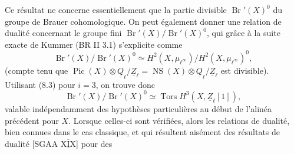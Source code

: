  Ce résultat ne concerne essentiellement que la partie divisible $\operatorname{Br}'(X)^0$ du groupe de Brauer cohomologique. On peut également donner une relation de dualité concernant le  groupe fini $\operatorname{Br}'(X)/\operatorname{Br}'(X)^0$, qui grâce à la suite exacte de Kummer (BR II 3.1) s'explicite comme
\[
\tag{8.8}\operatorname{Br}'(X)/\operatorname{Br}'(X)^0\simeq H^2(X,\mu_{\ell^\infty})/H^2(X,\mu_{\ell^\infty})^0,
\]
(compte tenu que $\operatorname{Pic}(X)\otimes\underline Q_{\ell}/\underline Z_{\ell}=\operatorname{NS}(X)\otimes\underline Q_{\ell}/\underline Z_{\ell}$ est divisible). Utilisant (8.3) pour $i=3$, on trouve donc
\[
\tag{8.9}\operatorname{Br}'(X)/\operatorname{Br}'(X)^0\simeq\operatorname{Tors}H^3(X,\underline Z_{\ell}[1]),
\]
\inserted{(}valable indépendamment des hypothèses particulières   au début de l'alinéa précédent pour $X$. Lorsque celles-ci sont vérifiées, alors les relations de dualité, bien connues dans le cas classique, et qui résultent aisément  des résultats de dualité [SGAA $\overline{\underline{\mathrm{XIX}}}$\quad] pour des
